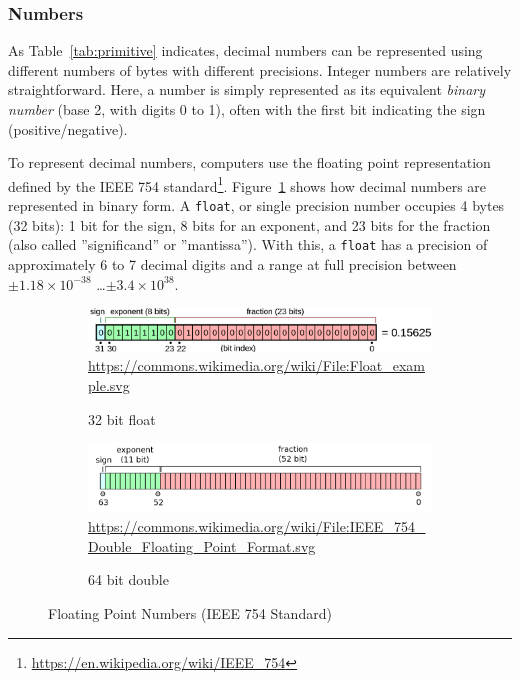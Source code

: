 \subsubsection*{Numbers} 

As Table~\ref{tab:primitive} indicates, decimal numbers can be represented using different numbers of bytes with different precisions. Integer numbers are relatively straightforward. Here, a number is simply represented as its equivalent \emph{binary number} (base 2, with digits 0 to 1), often with the first bit indicating the sign (positive/negative).

To represent decimal numbers, computers use the floating point representation defined by the IEEE 754 standard\footnote{\url{https://en.wikipedia.org/wiki/IEEE_754}}. Figure~\ref{fig:ieee754} shows how decimal numbers are represented in binary form. A \texttt{float}, or single precision number occupies 4 bytes (32 bits): 1 bit for the sign, 8 bits for an exponent, and 23 bits for the fraction (also called ''significand'' or ''mantissa''). With this, a \texttt{float} has a precision of approximately 6 to 7 decimal digits and a range at full precision between $\pm 1.18 \times 10^{-38}$ \ldots $\pm 3.4 \times 10^{38}$. 

\begin{figure}[h]
\centering
\begin{subfigure}[t]{\textwidth}
\centering
\includegraphics[width=.9\textwidth]{ieee75432.png}\\ \vspace{5mm}
\scriptsize{\url{https://commons.wikimedia.org/wiki/File:Float_example.svg}}
\caption{32 bit float}
\end{subfigure}
\begin{subfigure}[t]{\textwidth}
\centering
\includegraphics[width=\textwidth]{ieee754.png}
\scriptsize{\url{https://commons.wikimedia.org/wiki/File:IEEE_754_Double_Floating_Point_Format.svg}}
\caption{64 bit double}
\end{subfigure}
\caption{Floating Point Numbers (IEEE 754 Standard)}
\label{fig:ieee754}
\end{figure}


